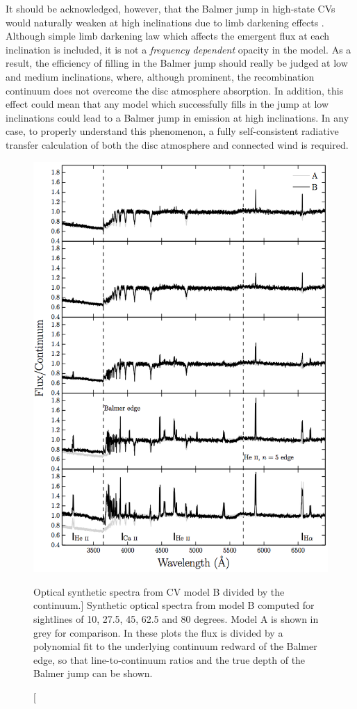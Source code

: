 It should be acknowledged, however,
that the Balmer jump in high-state CVs would naturally weaken at
high inclinations due to limb darkening effects \citep{ladous1989, ladous1989b}. 
Although simple limb darkening law which affects 
the emergent flux at each inclination is included,
it is not a {\em frequency dependent} opacity in the model.
As a result, the efficiency of filling in the Balmer jump
should really be judged at low and medium inclinations, 
where, although prominent, the recombination continuum does
not overcome the disc atmosphere absorption. 
In addition, this effect 
could mean that any model which successfully fills in the 
jump at low inclinations could lead to a Balmer jump 
in emission at high inclinations.
In any case, to properly understand this phenomenon, a fully self-consistent
radiative transfer calculation of both the disc atmosphere
and connected wind is required.

\begin{figure} 
\centering
\includegraphics[width=1.0\textwidth]{figures/05-cvpaper/modelb_opt_cont.png}
\caption
[Optical synthetic spectra from CV model B divided by the continuum.]{
Synthetic optical spectra from model B computed for 
sightlines of 10, 27.5, 45, 62.5 and 80 degrees. 
Model A is shown in grey for comparison.
In these plots the flux is divided by a polynomial fit to the 
underlying continuum redward of the Balmer edge, so that 
line-to-continuum ratios and the true depth of the
Balmer jump can be shown.
}
\label{continuumb}
\end{figure} 

